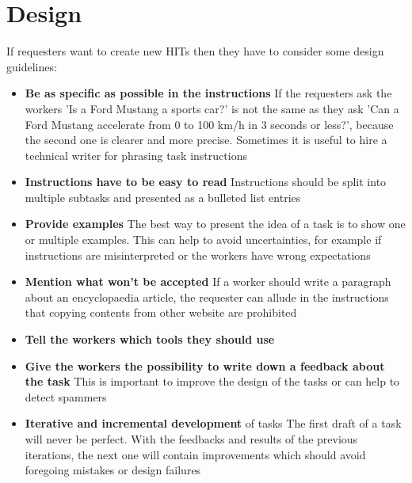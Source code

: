 \section{Design}
If requesters want to create new HITs then they have to consider some design guidelines\cite{crowdsourcing_tutorial,mturk_bestpractices}: 
\begin{itemize}
\item \textbf{Be as specific as possible in the instructions} If the requesters ask the workers 'Is a Ford Mustang a sports car?' is not the same as they ask 'Can a Ford Mustang accelerate from 0 to 100 km/h in 3 seconds or less?', because the second one is clearer and more precise. Sometimes it is useful to hire a technical writer for phrasing task instructions 
\item \textbf{Instructions have to be easy to read} Instructions should be split into multiple subtasks and presented as a bulleted list entries 
\item \textbf{Provide examples} The best way to present the idea of a task is to show one or multiple examples. This can help to avoid uncertainties, for example if instructions are misinterpreted or the workers have wrong expectations 
\item \textbf{Mention what won't be accepted} If a worker should write a paragraph about an encyclopaedia article, the requester can allude in the instructions that copying contents from other website are prohibited
\item \textbf{Tell the workers which tools they should use} 
\item \textbf{Give the workers the possibility to write down a feedback about the task} This is important to improve the design of the tasks or can help to detect spammers 
\item \textbf{Iterative and incremental development} of tasks The first draft of a task will never be perfect. With the feedbacks and results of the previous iterations, the next one will contain improvements which should avoid foregoing mistakes or design failures
\end{itemize}

